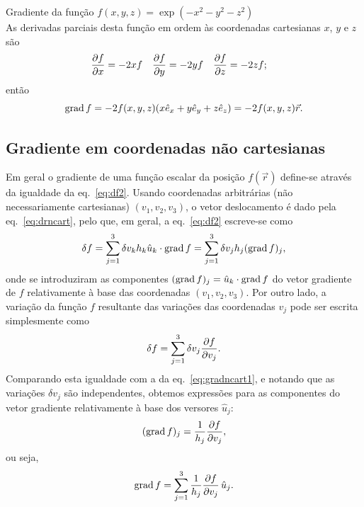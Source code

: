 \begin{examples}
\item Gradiente da função $f(x,y,z)=\exp(-x^2-y^2-z^2)$\\
\label{ex:gausgrad}
As derivadas parciais desta função em ordem às coordenadas cartesianas $x$, $y$
e $z$ são
\begin{align*}
\frac{\partial f}{\partial x}&=-2xf&
\frac{\partial f}{\partial y}&=-2yf&
\frac{\partial f}{\partial z}&=-2zf;
\end{align*}
então
\begin{equation*}
\grad f=-2f(x,y,z)(x\he_x+y\he_y+z\he_z)=-2f(x,y,z)\vec r.
\end{equation*}
\end{examples}

\subsection{Gradiente em coordenadas não cartesianas}
Em geral o gradiente de uma função escalar da posição $f(\vec r)$ define-se
através da igualdade da eq.~\eqref{eq:df2}. Usando coordenadas arbitrárias (não
necessariamente cartesianas) $(v_1,v_2,v_3)$, o vetor deslocamento é dado pela
eq.~\eqref{eq:drncart}, pelo que, em geral, a eq.~\eqref{eq:df2} escreve-se como
\begin{equation}\label{eq:gradncart1}
\delta f=\sum_{j=1}^3\delta v_kh_k\hat u_k\cdot\text{grad}\, f=
\sum_{j=1}^3\delta v_jh_j(\text{grad}\, f)_j,
\end{equation}
onde se introduziram as componentes $(\text{grad}\, f)_j=\hat u_k\cdot\text{grad}\, f$ do vetor
gradiente de $f$ relativamente à base das coordenadas $(v_1,v_2,v_3)$. Por outro
lado, a variação da função $f$ resultante das variações das coordenadas $v_j$
pode ser escrita simplesmente como
\begin{equation}
\delta f=\sum_{j=1}^3\delta v_j\frac{\partial f}{\partial v_j}.
\end{equation}
Comparando esta igualdade com a da eq.~\eqref{eq:gradncart1}, e notando que as
variações $\delta v_j$ são independentes, obtemos expressões para as componentes
do vetor gradiente relativamente à base dos versores $\hat u_j$:
\begin{equation*}
    (\text{grad}\, f)_j=\frac{1}{h_j}\frac{\partial f}{\partial v_j},
\end{equation*}
ou seja,
\begin{equation}\label{eq:gradncart}
\text{grad}\, f=\sum_{j=1}^3\frac{1}{h_j}\frac{\partial f}{\partial v_j}\,\hat u_j.
\end{equation}

